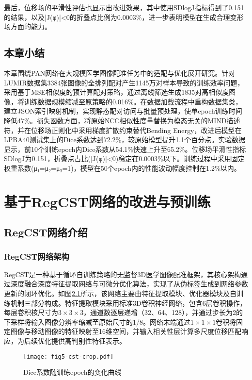 最后，位移场的平滑性评估也显示出改进效果，其中使用SDlogJ指标得到了0.151的结果，以及|J(φ)|<0的折叠点比例为0.0003\%，进一步表明模型在生成合理变形场方面的能力。


\section{本章小结}
本章围绕PAN网络在大规模医学图像配准任务中的适配与优化展开研究。针对LUMIR数据集3384张图像的全排列配对产生1145万对样本导致的训练效率问题，采用基于MSE相似度的预计算配对策略，通过离线筛选生成1835对高相似度图像，将训练数据规模缩减至原策略的0.016\%。在数据加载流程中重构数据集类，建立JSON索引映射机制，实现静态配对访问与批量预处理，使单epoch训练时间降低47\%。损失函数方面，将原始NCC相似性度量替换为模态无关的MIND描述符，并在位移场正则化中采用梯度扩散约束替代Bending Energy，改进后模型在LPBA40测试集上的Dice系数达到72.2\%，较原始模型提升1.1个百分点。实验数据显示，前10个训练epoch内Dice系数从54.1\%快速上升至65.2\%。位移场平滑性指标SDlogJ为0.151，折叠点占比(|J(φ)|<0)稳定在0.0003\%以下。训练过程中采用固定权重系数(μ₁=μ₂=μ₃=1)，模型在50个epoch内的性能波动幅度控制在1.2\%以内。

\chapter{基于RegCST网络的改进与预训练}

\section{RegCST网络介绍}

\subsection{RegCST网络架构}

RegCST是一种基于循环自训练策略的无监督3D医学图像配准框架，其核心架构通过深度融合深度特征提取网络与可微分优化算法，实现了从伪标签生成到网络参数更新的闭环优化。如图\ref{fig:regcst}所示，该网络主要由特征提取模块、优化器模块及自训练机制三部分构成。特征提取模块采用标准3D卷积神经网络，包含6层卷积操作，每层卷积核尺寸为$3 \times 3 \times 3$，通道数逐层递增（32、64、128），并通过步长为2的下采样将输入图像分辨率缩减至原始尺寸的1/8。网络末端通过$1 \times 1 \times 1$卷积将固定图像与移动图像的特征映射至16维空间，并输入相关性层计算多尺度位移匹配响应，为后续优化提供高判别性特征表示。

\begin{figure}[h]
    \centering
    \texttt{[image: fig5-cst-crop.pdf]}
    \caption{Dice系数随训练epoch的变化曲线}
    \label{fig:regcst}
\end{figure}

